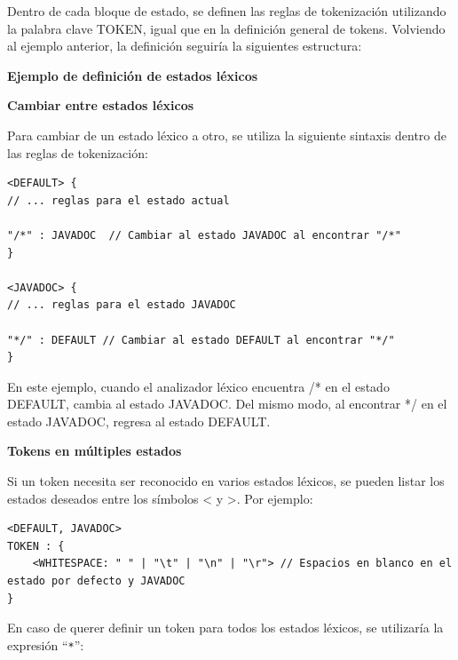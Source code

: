 \lstset{inputencoding=utf8/latin1}


Dentro de cada bloque de estado, se definen las reglas de tokenización utilizando la palabra clave TOKEN, igual que en la definición general de tokens.
Volviendo al ejemplo anterior, la definición seguiría la siguientes estructura:

\phantom{text}

\noindent \textbf{Ejemplo de definición de estados léxicos}

\phantom{text}

\lstset{inputencoding=utf8/latin1}



\phantom{text}

\noindent \textbf{Cambiar entre estados léxicos}

\phantom{text}

Para cambiar de un estado léxico a otro, se utiliza la siguiente sintaxis dentro de las reglas de tokenización:

\lstset{inputencoding=utf8/latin1}
\begin{lstlisting}
<DEFAULT> {
// ... reglas para el estado actual

"/*" : JAVADOC  // Cambiar al estado JAVADOC al encontrar "/*" 
} 

<JAVADOC> {
// ... reglas para el estado JAVADOC 

"*/" : DEFAULT // Cambiar al estado DEFAULT al encontrar "*/"
}
\end{lstlisting}

En este ejemplo, cuando el analizador léxico encuentra /* en el estado DEFAULT, cambia al estado JAVADOC. Del mismo modo, al encontrar */ en el estado JAVADOC, regresa al estado DEFAULT.

\phantom{text}

\noindent \textbf{Tokens en múltiples estados}

\phantom{text}

Si un token necesita ser reconocido en varios estados léxicos, se pueden listar los estados deseados entre los símbolos < y >. Por ejemplo:

\lstset{inputencoding=utf8/latin1}
\begin{lstlisting}
<DEFAULT, JAVADOC>
TOKEN : {
	<WHITESPACE: " " | "\t" | "\n" | "\r"> // Espacios en blanco en el estado por defecto y JAVADOC
}
\end{lstlisting}

En caso de querer definir un token para todos los estados léxicos, se utilizaría la expresión ``\lstinline|*|'':

